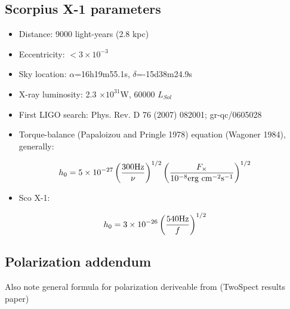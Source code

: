 \cite{Chakrabarty2003,GoetzThesis,GoetzTwoSpectMethods2011,PapaloizouPringle1978,Wagoner1984}


%
%





\subsection{Scorpius X-1 parameters}

\begin{itemize}
\item Distance: 9000 light-years (2.8 kpc)
\item Eccentricity: $<3\times10^{-3}$
\item Sky location: $\alpha$=16h19m55.1s, $\delta$=-15d38m24.9s
\item X-ray luminosity: 2.3 $\times10^{31}$W, 60000 $L_{Sol}$
\item First LIGO search: Phys. Rev. D 76 (2007) 082001; gr-qc/0605028
\item Torque-balance (Papaloizou and Pringle 1978) equation (Wagoner 1984),
generally:
\end{itemize}

\[
h_{0}=5\times10^{-27}\left(\frac{300\textup{Hz}}{\nu}\right)^{1/2}\left(\frac{F_{\times}}{10^{-8}\textup{erg cm}^{-2}\textup{s}^{-1}}\right)^{1/2}
\]

\begin{itemize}
\item Sco X-1:
\end{itemize}

\[
h_{0}=3\times10^{-26}\left(\frac{540\textup{Hz}}{f}\right)^{1/2}
\]



\subsection{Polarization addendum}


Also note general formula for polarization deriveable from (TwoSpect
results paper)


